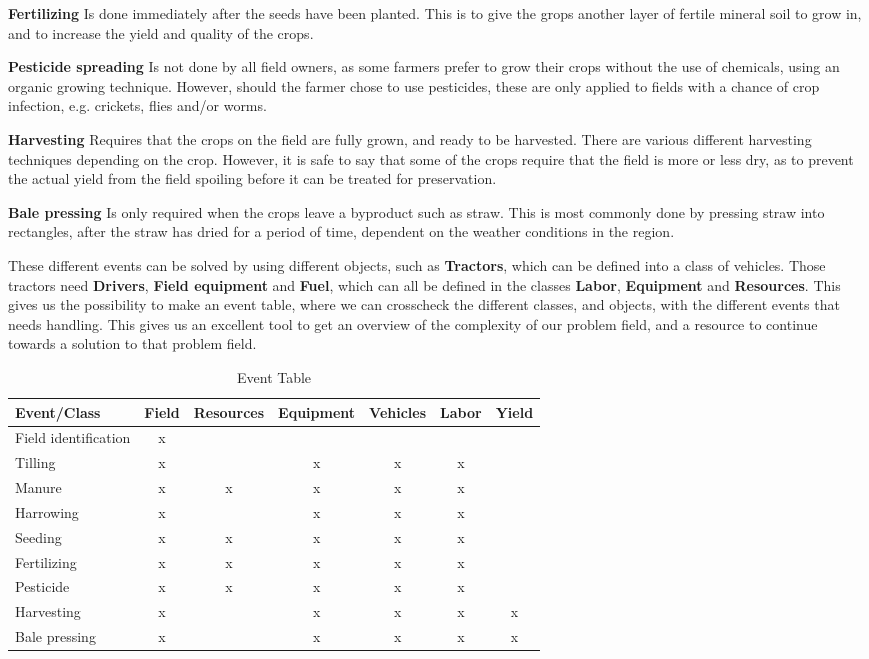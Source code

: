 \textbf{Fertilizing} Is done immediately after the seeds have been planted. This is to give the grops another layer of fertile mineral soil to grow in, and to increase the yield and quality of the crops.

\textbf{Pesticide spreading} Is not done by all field owners, as some farmers prefer to grow their crops without the use of chemicals, using an organic growing technique. However, should the farmer chose to use pesticides, these are only applied to fields with a chance of crop infection, e.g. crickets, flies and/or worms.

\textbf{Harvesting} Requires that the crops on the field are fully grown, and ready to be harvested. There are various different harvesting techniques depending on the crop. However, it is safe to say that some of the crops require that the field is more or less dry, as to prevent the actual yield from the field spoiling before it can be treated for preservation.

\textbf{Bale pressing} Is only required when the crops leave a byproduct such as straw. This is most commonly done by pressing straw into rectangles, after the straw has dried for a period of time, dependent on the weather conditions in the region.

These different events can be solved by using different objects, such as \textbf{Tractors}, which can be defined into a class of vehicles. Those tractors need \textbf{Drivers}, \textbf{Field equipment} and \textbf{Fuel}, which can all be defined in the classes \textbf{Labor}, \textbf{Equipment} and \textbf{Resources}. This gives us the possibility to make an event table, where we can crosscheck the different classes, and objects, with the different events that needs handling. This gives us an excellent tool to get an overview of the complexity of our problem field, and a resource to continue towards a solution to that problem field.

\begin{table}[H]
    \centering
    \begin{tabular}{|l|c|c|c|c|c|c|}
    \hline
         Event/Class & Field & Resources & Equipment & Vehicles & Labor & Yield \\\hline
         Field identification & x &   &   &   &   &   \\\hline
         Tilling       & x &   & x & x & x &   \\\hline
         Manure        & x & x & x & x & x &   \\\hline
         Harrowing     & x &   & x & x & x &   \\\hline
         Seeding       & x & x & x & x & x &   \\\hline
         Fertilizing   & x & x & x & x & x &   \\\hline
         Pesticide     & x & x & x & x & x &   \\\hline
         Harvesting    & x &   & x & x & x & x \\\hline
         Bale pressing & x &   & x & x & x & x \\\hline
    \end{tabular}
    \caption{Event Table}
    \label{event_table}
\end{table}

